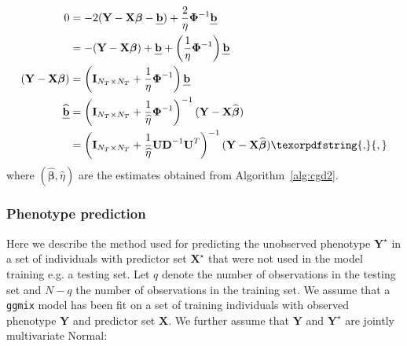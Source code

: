 \documentclass[10pt,letterpaper]{article}
\newcommand{\bX}{\textbf{X}}
\newcommand{\bY}{\textbf{Y}}
\newcommand{\bD}{\textbf{D}}
\newcommand{\bXtilde}{\widetilde{\bX}}
\newcommand{\bYtilde}{\widetilde{\bY}}
\newcommand{\bDtilde}{\widetilde{\bD}}
\newcommand{\bU}{\textbf{U}}
\newcommand{\bV}{\textbf{V}}
\newcommand{\bb}{\textbf{\emph{b}}}
\newcommand{\bI}{\textbf{I}}
\newcommand{\bbeta}{\boldsymbol{\beta}}
\newcommand{\bPhi}{\boldsymbol{\Phi}}
\providecommand{\DIFaddtex}[1]{{\protect\color{blue}\uwave{#1}}} %
\providecommand{\DIFaddbegin}{} %
\providecommand{\DIFaddend}{} %
\providecommand{\DIFadd}[1]{\texorpdfstring{\DIFaddtex{#1}}{#1}} %
\newcommand{\DIFaddincludegraphics}[2][]{{\color{blue}\fbox{\DIFOincludegraphics[#1]{#2}}}} %
\DeclareRobustCommand{\DIFaddbegin}{\DIFOaddbegin \let\includegraphics\DIFaddincludegraphics} %
\DeclareRobustCommand{\DIFaddend}{\DIFOaddend \let\includegraphics\DIFOincludegraphics} %
\begin{document}
\begin{align}
0 & = -2  (\bY - \bX \bbeta - \bb) + \frac{2}{\eta} \bPhi^{-1}\bb \nonumber \\
& = - (\bY - \bX \bbeta ) + \bb +  \left( \frac{1}{\eta}\bPhi^{-1}\right) \bb  \nonumber\\
(\bY - \bX \bbeta ) & = \left(\bI_{N_T \times N_T} +  \frac{1}{\eta}\bPhi^{-1}\right) \bb  \nonumber\\
\widehat{\bb} & = \left( \bI_{N_T \times N_T} +  \frac{1}{\widehat{\eta}}\bPhi^{-1}\right)^{-1}  (\bY - \bX \widehat{\bbeta} ) \nonumber \\
& = \left( \bI_{N_T \times N_T} +  \frac{1}{\widehat{\eta}} \bU \bD^{-1} \bU^T\right)^{-1}  (\bY - \bX \widehat{\bbeta} ) \DIFaddbegin \nonumber\DIFadd{,
}\DIFaddend \end{align}
where $(\widehat{\bbeta}, \widehat{\eta})$ are the estimates obtained from Algorithm~\ref{alg:cgd2}.



\subsubsection*{Phenotype prediction} \label{phenoprediction}

Here we describe the method used for predicting the unobserved phenotype $\bY^\star$ in a set of individuals with predictor set $\bX^\star$ that were not used in the model training e.g. a testing set. Let $q$ denote the number of observations in the testing set and $N-q$ the number of observations in the training set. We assume that a \texttt{ggmix} model has been fit on a set of training individuals with observed phenotype $\bY$ and predictor set $\bX$.  We further assume that $\bY$ and $\bY^\star$ are jointly multivariate Normal:
\end{document}
